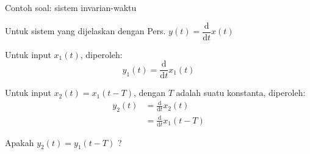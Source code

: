 \begin{frame}{Contoh soal: sistem invarian-waktu}

Untuk sistem yang dijelaskan dengan Pers. $y(t) = \dfrac{\mathrm{d}}{\mathrm{d}t} x(t)$

Untuk input $x_{1}(t)$, diperoleh:
\begin{equation*}
y_{1}(t) = \frac{\mathrm{d}}{\mathrm{d}t} x_{1}(t)
\end{equation*}

Untuk input $x_{2}(t) = x_{1}(t - T)$, dengan $T$ adalah suatu konstanta, diperoleh:
\begin{align*}
y_{2}(t) & = \frac{\mathrm{d}}{\mathrm{d}t} x_{2}(t) \\
         & = \frac{\mathrm{d}}{\mathrm{d}t} x_{1}(t-T)
\end{align*}

Apakah $y_{2}(t) = y_{1}(t-T)$ ?

\end{frame}

